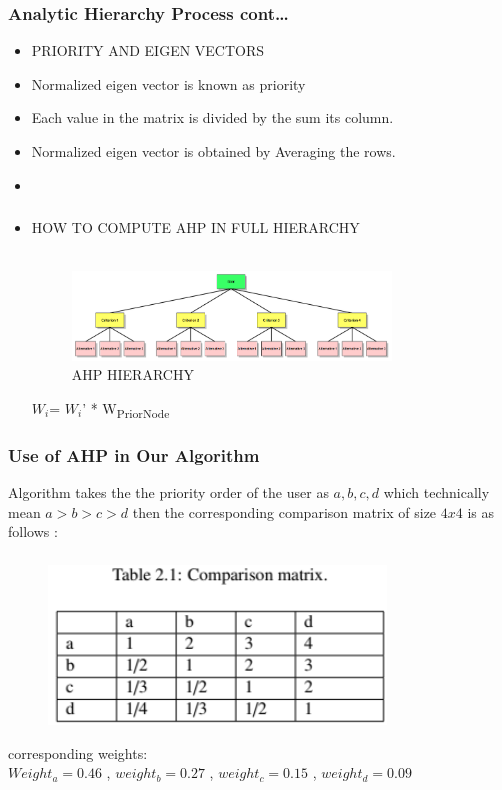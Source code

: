 \documentclass[10pt, compress]{beamer}
\begin{document}
\begin{frame}[fragile]
  \frametitle{Analytic Hierarchy Process cont\ldots}
  \begin{itemize}
  \item<1> \alert{PRIORITY AND EIGEN VECTORS}
  \item<1> Normalized eigen vector is known as priority
  \item<1> Each value in the matrix is divided by the sum its column.
  \item<1> Normalized eigen vector is obtained by Averaging the rows.
  \item<1> 
 \end{itemize}
\end{frame}

\begin{frame}[fragile]
  \frametitle{}
  \begin{itemize}
 \item<1> \alert{HOW TO COMPUTE AHP IN FULL HIERARCHY }\\~\
 \begin{figure}[h!]
    \centering
    \includegraphics[width=0.8\textwidth]{images/AHP.png}
    \caption{AHP HIERARCHY}
    \label{fig:AHP}
\end{figure}
$W_i$=  $W_i$’ * W\textsubscript{PriorNode}
 \end{itemize}
\end{frame}

\begin{frame}[fragile]
  \frametitle{Use of AHP in Our Algorithm}
Algorithm takes the the priority order of  the user as $a , b , c , d $  which technically mean $ a > b > c > d $ then the corresponding comparison matrix of size $ 4 x 4 $ is as follows : 
\end{frame}

\begin{frame}[fragile]
  \frametitle{}
   \begin{figure}[h!]
    \centering
    \includegraphics[width=0.8\textwidth]{images/Capture_1.png}
\end{figure}
corresponding weights:\\
$Weight_a = 0.46$ , $weight_b = 0.27$ , $weight_c = 0.15$ , $weight_d = 0.09$
\end{frame}
\end{document}

